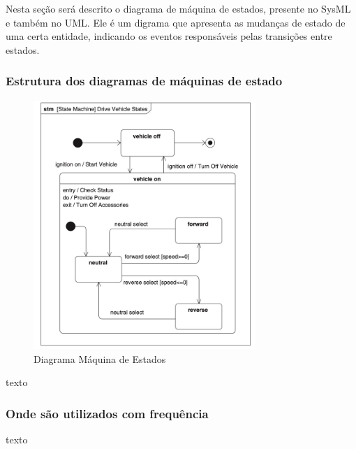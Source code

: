Nesta seção será descrito o diagrama de máquina de estados, presente no SysML e também no UML. Ele é um digrama que apresenta as mudanças de estado de uma certa entidade, indicando os eventos responsáveis pelas transições entre estados.


\subsubsection{Estrutura dos diagramas de máquinas de estado}
\begin{figure}[H]
\centering
\includegraphics[width=0.75\textwidth]{figures/diagrama-maquina-estados.jpeg}
\caption{Diagrama Máquina de Estados}
\end{figure}
texto

\subsubsection{Onde são utilizados com frequência}
texto